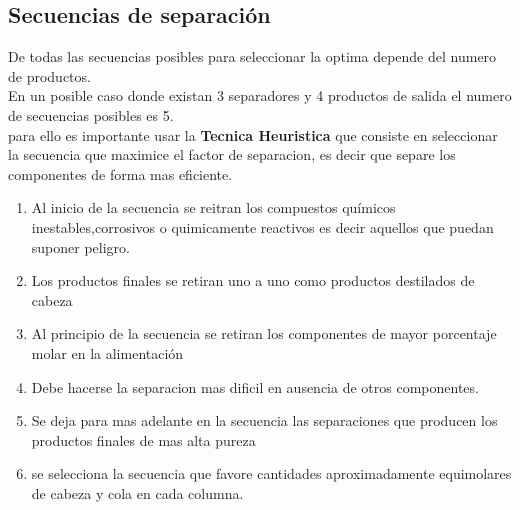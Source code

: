 \documentclass{report}
\begin{document}
\subsection{Secuencias de separación}
\begin{raggedright}
	De todas las secuencias posibles para seleccionar la optima depende del numero de productos.\\
	En un posible caso donde existan 3 separadores y 4 productos de salida el numero de secuencias posibles es 5.\\
	para ello es importante usar la \textbf{Tecnica Heuristica} que consiste en seleccionar la secuencia que maximice el factor de separacion, es decir que separe los componentes de forma mas eficiente.
	\begin{enumerate}
		\item Al inicio de la secuencia se reitran los compuestos químicos inestables,corrosivos o quimicamente reactivos es decir aquellos que puedan suponer peligro.
		\item Los productos finales se retiran uno a uno como productos destilados de cabeza 
		\item Al principio de la secuencia se retiran los componentes de mayor porcentaje molar en la alimentación
		\item Debe hacerse la separacion mas dificil en ausencia de otros componentes.
		\item Se deja para mas adelante en la secuencia las  separaciones que producen los productos finales de mas alta pureza
		\item se  selecciona la secuencia que favore cantidades aproximadamente equimolares de cabeza y cola en cada columna.
	\end{enumerate}
\end{raggedright}
\end{document}
